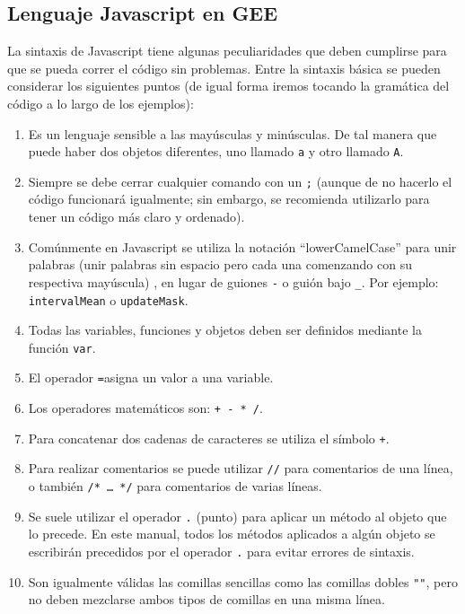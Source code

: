 \documentclass[
  12pt,
  letterpaper,
  twoside]{book}
\providecommand{\tightlist}{%
  \setlength{\itemsep}{0pt}\setlength{\parskip}{0pt}}
\begin{document}
\hypertarget{lenguaje-javascript-en-gee}{%
\subsection{Lenguaje Javascript en GEE}\label{lenguaje-javascript-en-gee}}

La sintaxis de Javascript tiene algunas peculiaridades que deben cumplirse para que se pueda correr el código sin problemas. Entre la sintaxis básica se pueden considerar los siguientes puntos (de igual forma iremos tocando la gramática del código a lo largo de los ejemplos):

\begin{enumerate}
\def\labelenumi{\arabic{enumi}.}
\tightlist
\item
  Es un lenguaje sensible a las mayúsculas y minúsculas. De tal manera que puede haber dos objetos diferentes, uno llamado \texttt{a} y otro llamado \texttt{A}.
\item
  Siempre se debe cerrar cualquier comando con un \texttt{;} (aunque de no hacerlo el código funcionará igualmente; sin embargo, se recomienda utilizarlo para tener un código más claro y ordenado).
\item
  Comúnmente en Javascript se utiliza la notación ``lowerCamelCase'' para unir palabras (unir palabras sin espacio pero cada una comenzando con su respectiva mayúscula) , en lugar de guiones \texttt{-} o guión bajo \texttt{\_}. Por ejemplo: \texttt{intervalMean} o \texttt{updateMask}.
\item
  Todas las variables, funciones y objetos deben ser definidos mediante la función \texttt{var}.
\item
  El operador \texttt{=}asigna un valor a una variable.
\item
  Los operadores matemáticos son: \texttt{+\ -\ *\ /}.
\item
  Para concatenar dos cadenas de caracteres se utiliza el símbolo \texttt{+}.
\item
  Para realizar comentarios se puede utilizar \texttt{//} para comentarios de una línea, o también \texttt{/*\ \ldots{}\ */} para comentarios de varias líneas.
\item
  Se suele utilizar el operador \texttt{.} (punto) para aplicar un método al objeto que lo precede. En este manual, todos los métodos aplicados a algún objeto se escribirán precedidos por el operador \texttt{.} para evitar errores de sintaxis.
\item
  Son igualmente válidas las comillas sencillas \texttt{\textquotesingle{}\textquotesingle{}} como las comillas dobles \texttt{""}, pero no deben mezclarse ambos tipos de comillas en una misma línea.
\end{enumerate}
\end{document}
